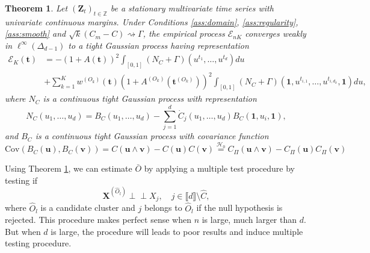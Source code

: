 \documentclass[11pt]{article}
\newcommand{\Cov}{\mathrm{Cov}}
\newtheorem{theorem}{Theorem}
\theoremstyle{definition}
\newcommand{\indep}{\perp \!\!\! \perp}
\begin{document}
	\begin{theorem}
		\label{thm:weak_conv}
		Let $(\textbf{Z}_t)_{t \in \mathbb{Z}}$ be a stationary multivariate time series with univariate continuous margins. Under Conditions \ref{ass:domain}, \ref{ass:regularity}, \ref{ass:smooth} and $\sqrt{k}(C_m - C) \rightsquigarrow \Gamma$, the empirical process $\mathcal{E}_{nK}$ converges weakly in $\ell^{\infty}(\Delta_{d-1})$ to a tight Gaussian process having representation
		\begin{align*}
			\mathcal{E}_K(\textbf{t}) &= -\left(1+A(\textbf{t})\right)^2 \int_{[0,1]} (N_C + \Gamma)(u^{t_1}, \dots, u^{t_d})du \\ &+ \sum_{k=1}^K w^{(O_k)}(\textbf{t})\left(1+A^{(O_k)}(\textbf{t}^{(O_k)})\right)^2 \int_{[0,1]} (N_C + \Gamma)(\textbf{1},u^{t_{i,1}}, \dots, u^{t_{i,d_k}}, \textbf{1})du,
		\end{align*}
		where $N_C$ is a continuous tight Gaussian process with representation 
		\begin{equation*}
			N_C(u_1,\dots,u_d) = B_C(u_1, \dots, u_d) - \sum_{j=1}^d \dot{C}_j(u_1, \dots, u_d) B_C(\textbf{1}, u_i, \textbf{1}),
		\end{equation*}
		and $B_C$ is a continuous tight Gaussian process with covariance function
		\begin{equation*}
			\Cov(B_C(\textbf{u}), B_C(\textbf{v})) = C(\textbf{u} \wedge \textbf{v}) - C(\textbf{u})C(\textbf{v}) \overset{\mathcal{H}_0}{=} C_{\Pi}(\textbf{u} \wedge \textbf{v}) - C_{\Pi}(\textbf{u})C_{\Pi}(\textbf{v})
		\end{equation*}
	\end{theorem}
	
	Using Theorem \ref{thm:weak_conv}, we can estimate $\bar{O}$ by applying a multiple test procedure by testing if
	\begin{equation}
		\textbf{X}^{(\hat{O}_l)} \indep X_j, \quad j \in \llbracket d \rrbracket \setminus \hat{C},
	\end{equation}	 
	where $\hat{O}_l$ is a candidate cluster and $j$ belongs to $\hat{O}_l$ if the null hypothesis is rejected. This procedure makes perfect sense when $n$ is large, much larger than $d$. But when $d$ is large, the procedure will leads to poor results and induce multiple testing procedure.
	
\end{document}
